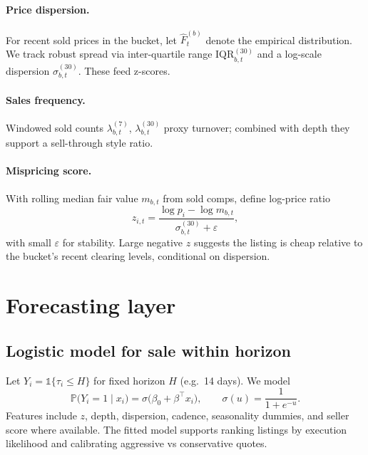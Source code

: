 \documentclass[11pt,a4paper]{article}
\begin{document}
\paragraph{Price dispersion.} For recent sold prices in the bucket, let $\hat{F}^{(b)}_t$ denote
the empirical distribution. We track robust spread via inter-quartile range
$\mathrm{IQR}^{(30)}_{b,t}$ and a log-scale dispersion $\sigma^{(30)}_{b,t}$. These feed z-scores.

\paragraph{Sales frequency.} Windowed sold counts $\lambda^{(7)}_{b,t}$, $\lambda^{(30)}_{b,t}$
proxy turnover; combined with depth they support a sell-through style ratio.

\paragraph{Mispricing score.} With rolling median fair value $m_{b,t}$ from sold comps, define
log-price ratio
\[
  z_{i,t} = \frac{\log p_i - \log m_{b,t}}{\sigma^{(30)}_{b,t} + \varepsilon},
\]
with small $\varepsilon$ for stability. Large negative $z$ suggests the listing is cheap relative
to the bucket's recent clearing levels, conditional on dispersion.

\section{Forecasting layer}
\subsection{Logistic model for sale within horizon}
Let $Y_i = \mathbb{1}\{\tau_i \le H\}$ for fixed horizon $H$ (e.g.\ 14 days). We model
\begin{equation}
  \mathbb{P}\bigl(Y_i = 1 \mid x_i\bigr) = \sigma\bigl(\beta_0 + \beta^\top x_i\bigr),
  \qquad \sigma(u) = \frac{1}{1 + e^{-u}}.
  \label{eq:logistic}
\end{equation}
Features include $z$, depth, dispersion, cadence, seasonality dummies, and seller score where
available. The fitted model supports ranking listings by execution likelihood and calibrating
aggressive vs conservative quotes.
\end{document}

